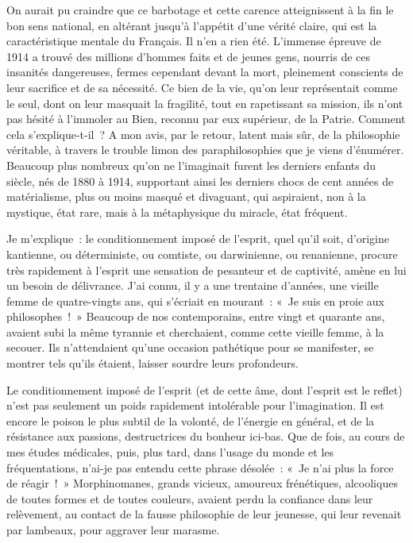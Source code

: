 \documentclass[french,twoside]{book} %
\begin{document}
On aurait pu craindre que ce barbotage et cette carence atteignissent à la fin le bon sens national, en altérant jusqu’à l’appétit d’une vérité claire, qui est la caractéristique mentale du Français. Il n’en a rien été. L’immense épreuve de 1914 a trouvé des millions d’hommes faits et de jeunes gens, nourris de ces insanités dangereuses, fermes cependant devant la mort, pleinement conscients de leur sacrifice et de sa nécessité. Ce bien de la vie, qu’on leur représentait comme le seul, dont on leur masquait la fragilité, tout en rapetissant sa mission, ils n’ont pas hésité à l’immoler au Bien, reconnu par eux supérieur, de la Patrie. Comment cela s’explique-t-il ? A mon avis, par le retour, latent mais sûr, de la philosophie véritable, à travers le trouble limon des paraphilosophies que je viens d’énumérer. Beaucoup plus nombreux qu’on ne l’imaginait furent les derniers enfants du siècle, nés de 1880 à 1914, supportant ainsi les derniers chocs de cent années de matérialisme, plus ou moins masqué et divaguant, qui aspiraient, non à la mystique, état rare, mais à la métaphysique du miracle, état fréquent.\par
Je m’explique : le conditionnement imposé de l’esprit, quel qu’il soit, d’origine kantienne, ou déterministe, ou comtiste, ou darwinienne, ou renanienne, procure très rapidement à l’esprit une sensation de pesanteur et de captivité, amène en lui un besoin de délivrance. J’ai connu, il y a une trentaine d’années, une vieille femme de quatre-vingts ans, qui s’écriait en mourant : « Je suis en proie aux philosophes ! » Beaucoup de nos contemporains, entre vingt et quarante ans, avaient subi la même tyrannie et cherchaient, comme cette vieille femme, à la secouer. Ils n’attendaient qu’une occasion pathétique pour se manifester, se montrer tels qu’ils étaient, laisser sourdre leurs profondeurs.\par
Le conditionnement imposé de l’esprit (et de cette âme, dont l’esprit est le reflet) n’est pas seulement un poids rapidement intolérable pour l’imagination. Il est encore le poison le plus subtil de la volonté, de l’énergie en général, et de la résistance aux passions, destructrices du bonheur ici-bas. Que de fois, au cours de mes études médicales, puis, plus tard, dans l’usage du monde et les fréquentations, n’ai-je pas entendu cette phrase désolée : « Je n’ai plus la force de réagir ! » Morphinomanes, grands vicieux, amoureux frénétiques, alcooliques de toutes formes et de toutes couleurs, avaient perdu la confiance dans leur relèvement, au contact de la fausse philosophie de leur jeunesse, qui leur revenait par lambeaux, pour aggraver leur marasme.\par
\end{document}
